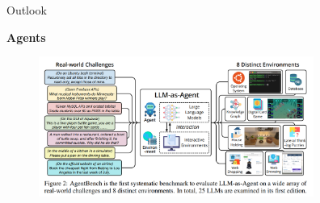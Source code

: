 \begin{vbframe}{Outlook}

\vfill

\textbf{Agents}

\begin{figure}
	\centering
		\includegraphics[width = 9cm]{figure/agent-bench.png}\\ 
\end{figure}
	
\vfill

\end{vbframe}


\endlecture
